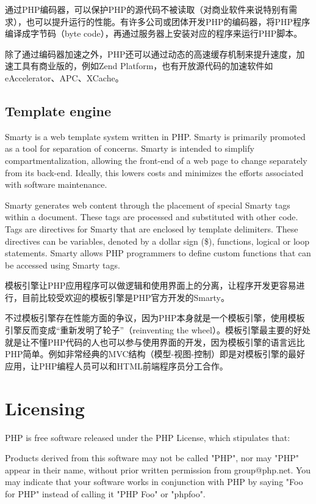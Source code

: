 通过PHP编码器，可以保护PHP的源代码不被读取（对商业软件来说特别有需求），也可以提升运行的性能。有许多公司或团体开发PHP的编码器，将PHP程序编译成字节码（byte code），再通过服务器上安装对应的程序来运行PHP脚本。

除了通过编码器加速之外，PHP还可以通过动态的高速缓存机制来提升速度，加速工具有商业版的，例如Zend Platform，也有开放源代码的加速软件如eAccelerator、APC、XCache。

\section{Template engine}

Smarty is a web template system written in PHP. Smarty is primarily promoted as a tool for separation of concerns. Smarty is intended to simplify compartmentalization, allowing the front-end of a web page to change separately from its back-end. Ideally, this lowers costs and minimizes the efforts associated with software maintenance.

Smarty generates web content through the placement of special Smarty tags within a document. These tags are processed and substituted with other code. Tags are directives for Smarty that are enclosed by template delimiters. These directives can be variables, denoted by a dollar sign (\$), functions, logical or loop statements. Smarty allows PHP programmers to define custom functions that can be accessed using Smarty tags.

模板引擎让PHP应用程序可以做逻辑和使用界面上的分离，让程序开发更容易进行，目前比较受欢迎的模板引擎是PHP官方开发的Smarty\cite{smarty}。

不过模板引擎存在性能方面的争议，因为PHP本身就是一个模板引擎，使用模板引擎反而变成“重新发明了轮子”（reinventing the wheel）。模板引擎最主要的好处就是让不懂PHP代码的人也可以参与使用界面的开发，因为模板引擎的语言远比PHP简单。例如非常经典的MVC结构（模型-视图-控制）即是对模板引擎的最好应用，让PHP编程人员可以和HTML前端程序员分工合作。




\chapter{Licensing}

PHP is free software released under the PHP License, which stipulates that:

Products derived from this software may not be called "PHP", nor may "PHP" appear in their name, without prior written permission from group@php.net. You may indicate that your software works in conjunction with PHP by saying "Foo for PHP" instead of calling it "PHP Foo" or "phpfoo".



